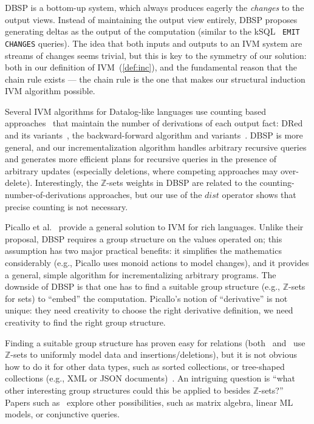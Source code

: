\documentclass[twocolumn
]{svjour3}
\numberwithin{equation}{section}
\newcommand{\dbsp}{DBSP\xspace}
\newcommand{\zrs}{$\Z$-sets\xspace} %
\newcommand{\Z}{\mathbb{Z}}  %
\newcommand{\distinct}{\mathit{dist}}  %
\begin{document}
\dbsp is a bottom-up system, which always produces eagerly the
\emph{changes} to the output views.  Instead of maintaining the output
view entirely, \dbsp proposes generating deltas as the output of the
computation (similar to the kSQL~\cite{jafarpour-edbt19} \texttt{EMIT
  CHANGES} queries).  The idea that both inputs and outputs to an IVM
system are streams of changes seems trivial, but this is key to the
symmetry of our solution: both in our definition of
IVM~(\ref{def:inc}), and the fundamental reason that the chain rule
exists --- the chain rule is the one that makes our structural
induction IVM algorithm possible.

Several IVM algorithms for Datalog-like languages use counting based
approaches~\cite{Dewan-iis92,motik-aaai15} that maintain the number of
derivations of each output fact: DRed~\cite{gupta-sigmod93} and its
variants~\cite{Ceri-VLDB91,Wolfson-sigmod91,Staudt-vldb96,Kotowski-rr11,Lu-sigmod95,Apt-sigmod87},
the backward-for\-ward algorithm and
variants~\cite{motik-aaai15,Harrison-wdd92,motik-ai19}.  \dbsp is more
general, and our incrementalization algorithm handles arbitrary
recursive queries and generates more efficient plans for recursive
queries in the presence of arbitrary updates (especially deletions,
where competing ap\-proach\-es may over-delete).  Interestingly, the \zrs
weights in \dbsp are related to the counting-number-of-derivations
approaches, but our use of the $\distinct$ operator shows that precise
counting is not necessary.

Picallo et al.~\cite{picallo-scop19} provide a general solution to IVM
for rich languages.  Unlike their proposal, \dbsp requires a group
structure on the values operated on; this assumption has two major
practical benefits: it simplifies the mathematics considerably (e.g.,
Picallo uses monoid actions to model changes), and it provides a
general, simple algorithm for incrementalizing arbitrary programs.
The downside of \dbsp is that one has to find a suitable group
structure (e.g., \zrs for sets) to ``embed'' the computation.
Picallo's notion of ``derivative'' is not unique: they need creativity
to choose the right derivative definition, we need creativity to find
the right group structure.

Finding a suitable group structure has proven easy for relations
(both~\cite{koch-pods10} and~\cite{green-tcs11} use \zrs to uniformly
model data and insertions/deletions), but it is not obvious how to do
it for other data types, such as sorted collections, or tree-shaped
collections (e.g., XML or JSON documents)~\cite{foster-planx08}.  An
intriguing question is ``what other interesting group structures could
this be applied to besides \zrs?''  Papers such
as~\cite{nikolic-icmd18} explore other possibilities, such as matrix
algebra, linear ML models, or conjunctive queries.
\end{document}
